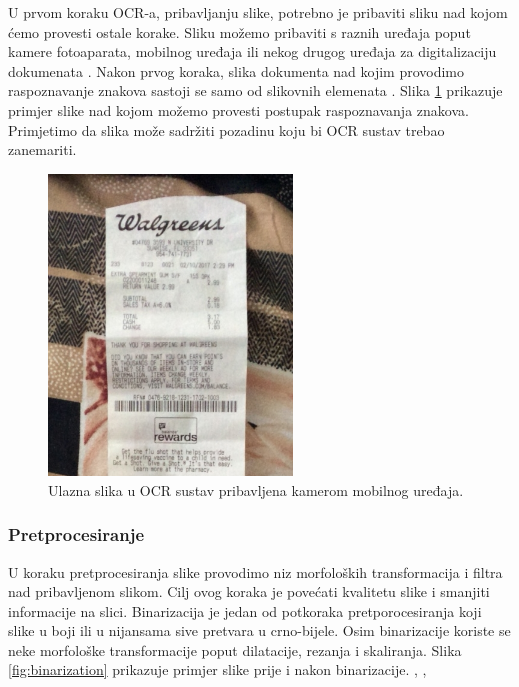 \documentclass[times, utf8, zavrsni]{fer}
\begin{document}
U prvom koraku OCR-a, pribavljanju slike, potrebno je pribaviti sliku nad kojom ćemo
provesti ostale korake. Sliku možemo pribaviti s raznih uređaja poput kamere fotoaparata,
mobilnog uređaja ili nekog drugog uređaja za digitalizaciju dokumenata .
Nakon prvog koraka, slika dokumenta nad kojim provodimo raspoznavanje znakova sastoji se
samo od slikovnih elemenata  \citep{Vynckier:2018:HowOcrWorks}.
Slika \ref{fig:receipt-example-02} prikazuje primjer slike nad kojom možemo provesti
postupak raspoznavanja znakova. Primjetimo da slika može sadržiti pozadinu koju bi
OCR sustav trebao zanemariti.

\begin{figure}[htb]
    \centering
    \includegraphics[height=8cm]{images/receipt-example-02.jpeg}
    \caption{Ulazna slika u OCR sustav pribavljena kamerom mobilnog uređaja.}
    \label{fig:receipt-example-02}
\end{figure}

\subsubsection{Pretprocesiranje}

U koraku pretprocesiranja slike provodimo niz morfoloških transformacija i filtra nad pribavljenom slikom.
Cilj ovog koraka je povećati kvalitetu slike i smanjiti informacije na slici. Binarizacija je jedan od
potkoraka pretporocesiranja koji slike u boji ili u nijansama sive pretvara u crno-bijele. Osim binarizacije
koriste se neke morfološke transformacije poput dilatacije, rezanja i skaliranja.
Slika \ref{fig:binarization} prikazuje primjer slike prije i nakon binarizacije. \citep{Gulan:2016:Bacherlor},
\citep{DBLP:journals/corr/abs-1710-05703}, \citep{Jurin:2017:Master}
\end{document}

